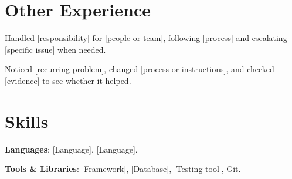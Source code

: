 \documentclass{resume}
\begin{document}
\section{Other Experience}

\begin{jobduties}
  \item Handled [responsibility] for [people or team], following [process] and escalating [specific issue] when needed.
  \item Noticed [recurring problem], changed [process or instructions], and checked [evidence] to see whether it helped.
\end{jobduties}

\section{Skills}
\begin{skillitems}
  \item \textbf{Languages}: [Language], [Language].
  \item \textbf{Tools \& Libraries}: [Framework], [Database], [Testing tool], Git.
\end{skillitems}
\end{document}
